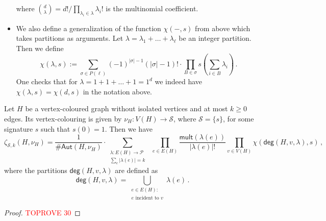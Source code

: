 \documentclass[authorcolumns,numberwithinsect]{no-lipics-v2022}
\begin{document}
\begin{itemize}
\begin{equation}
    \end{equation}
    where $\binom{d}{\lambda} = d! / \prod_{\lambda_i \in \lambda} \lambda_i!$ is the multinomial coefficient.
    \item We also define a generalization of the function $\chi(-, s)$ from above which takes partitions as arguments. Let $\lambda = \lambda_1 + \ldots + \lambda_\ell$ be an integer partition. Then we define
    \begin{equation} \label{eqn:chi_generalization}
        \chi(\lambda , s) := \sum_{\sigma\in P(\ell)} (-1)^{|\sigma|-1} (|\sigma|-1)! \cdot \prod_{B \in \sigma} s\left(\sum_{i \in B} \lambda_i \right)\,.
    \end{equation}
    One checks that for $\lambda = 1 + 1 + \ldots + 1 = 1^d$ we indeed have $\chi(\lambda, s)=\chi(d,s)$ in the notation above.
\end{itemize}

\begin{theorem}\label{thm:zeta_at_most_k_edges}
Let $H$ be a vertex-coloured graph without isolated vertices and at most $k \geq 0$ edges. Its vertex-colouring is given by $\nu_H : V(H) \to \mathcal{S}$, where $\mathcal{S} = \{s\}$, for some signature $s$ such that $s(0) = 1$. Then we have
\begin{equation} \label{eqn:Theorem_general1}
    \zeta_{\mathcal{S}, k}(H,\nu_H)=\frac{1}{\#\mathsf{Aut}(H, \nu_H)} \cdot \sum_{\substack{\lambda: E(H) \to \mathcal{P}\\\sum_e |\lambda(e)| = k }}\ \  \prod_{e \in E(H)} \frac{\mathsf{mult}(\lambda(e))}{|\lambda(e)|!}  \prod_{v \in V(H)} \chi(\mathsf{deg}(H, v, \lambda), s)\,,
\end{equation}
where the partitions $\mathsf{deg}(H, v, \lambda)$ are defined as
\[
\mathsf{deg}(H, v, \lambda) = \bigcup_{\substack{e \in E(H):\\ e \text{ incident to }v}} \lambda(e)\,. 
\]
\end{theorem}
\begin{proof}\textcolor{red}{TOPROVE 30}\end{proof}
\end{document}
